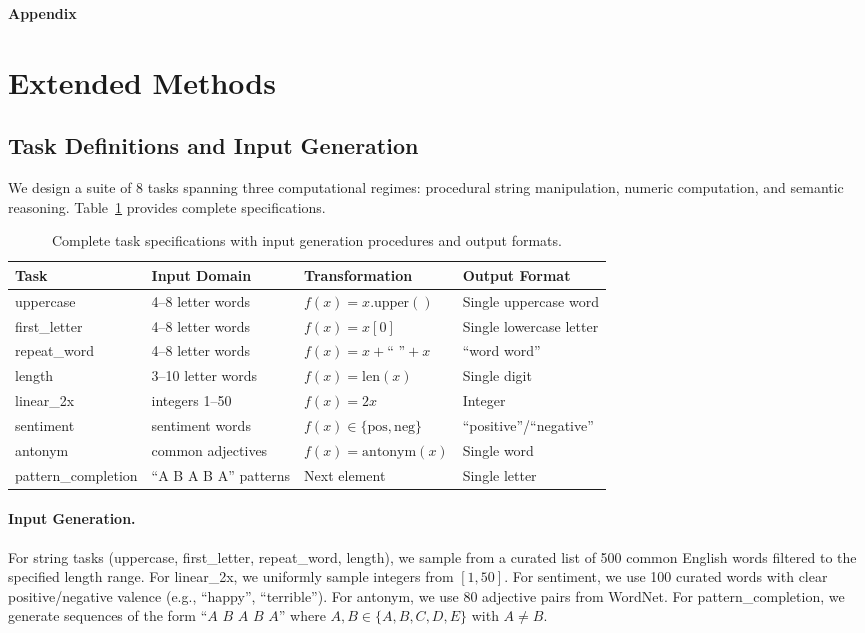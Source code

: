 \documentclass[runningheads]{llncs}
\begin{document}
\newpage
\appendix
\begin{center}
\Large\textbf{Appendix}
\end{center}
\vspace{1em}

\section{Extended Methods}
\label{app:methods}

\subsection{Task Definitions and Input Generation}

We design a suite of 8 tasks spanning three computational regimes: procedural string manipulation, numeric computation, and semantic reasoning. Table~\ref{tab:task_details} provides complete specifications.

\begin{table}[h]
\centering
\caption{Complete task specifications with input generation procedures and output formats.}
\label{tab:task_details}
\begin{tabular}{@{}llll@{}}
\toprule
Task & Input Domain & Transformation & Output Format \\
\midrule
uppercase & 4--8 letter words & $f(x) = x.\text{upper}()$ & Single uppercase word \\
first\_letter & 4--8 letter words & $f(x) = x[0]$ & Single lowercase letter \\
repeat\_word & 4--8 letter words & $f(x) = x + \text{`` ''} + x$ & ``word word'' \\
length & 3--10 letter words & $f(x) = \text{len}(x)$ & Single digit \\
linear\_2x & integers 1--50 & $f(x) = 2x$ & Integer \\
sentiment & sentiment words & $f(x) \in \{\text{pos}, \text{neg}\}$ & ``positive''/``negative'' \\
antonym & common adjectives & $f(x) = \text{antonym}(x)$ & Single word \\
pattern\_completion & ``A B A B A'' patterns & Next element & Single letter \\
\bottomrule
\end{tabular}
\end{table}

\paragraph{Input Generation.} For string tasks (uppercase, first\_letter, repeat\_word, length), we sample from a curated list of 500 common English words filtered to the specified length range. For linear\_2x, we uniformly sample integers from $[1, 50]$. For sentiment, we use 100 curated words with clear positive/negative valence (e.g., ``happy'', ``terrible''). For antonym, we use 80 adjective pairs from WordNet. For pattern\_completion, we generate sequences of the form ``$A$ $B$ $A$ $B$ $A$'' where $A, B \in \{A, B, C, D, E\}$ with $A \neq B$.
\end{document}
